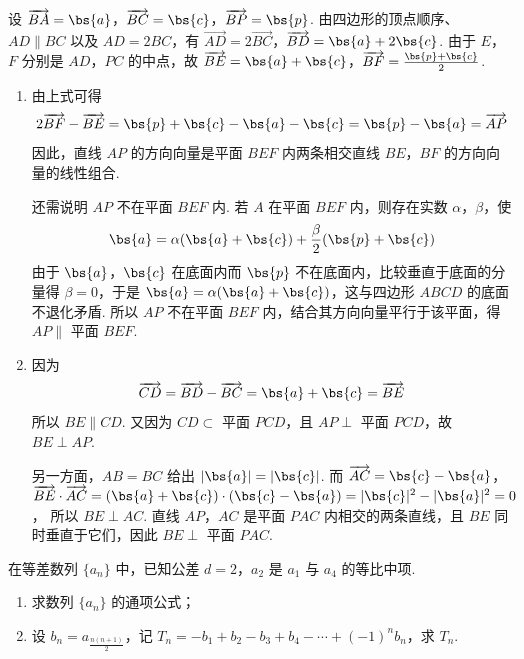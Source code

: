 \begin{solution}
设 \(\overrightarrow{BA}=\bs{a}\)，\(\overrightarrow{BC}=\bs{c}\)，\(\overrightarrow{BP}=\bs{p}\). 由四边形的顶点顺序、\(AD\parallel BC\) 以及 \(AD=2BC\)，有
\(\overrightarrow{AD}=2\overrightarrow{BC}\)，\(\overrightarrow{BD}=\bs{a}+2\bs{c}\).
由于 \(E\)，\(F\) 分别是 \(AD\)，\(PC\) 的中点，故
\(\overrightarrow{BE}=\bs{a}+\bs{c}\)，\(\overrightarrow{BF}=\frac{\bs{p}+\bs{c}}{2}\).

\begin{enumerate}
\item 由上式可得
\[
2\overrightarrow{BF}-\overrightarrow{BE}=\bs{p}+\bs{c}-\bs{a}-\bs{c}=\bs{p}-\bs{a}=\overrightarrow{AP}
\]
因此，直线 \(AP\) 的方向向量是平面 \(BEF\) 内两条相交直线 \(BE\)，\(BF\) 的方向向量的线性组合.

还需说明 \(AP\) 不在平面 \(BEF\) 内. 若 \(A\) 在平面 \(BEF\) 内，则存在实数 \(\alpha\)，\(\beta\)，使
\[
\bs{a}=\alpha(\bs{a}+\bs{c})+\frac{\beta}{2}(\bs{p}+\bs{c})
\]
由于 \(\bs{a}\)，\(\bs{c}\) 在底面内而 \(\bs{p}\) 不在底面内，比较垂直于底面的分量得 \(\beta=0\)，于是 \(\bs{a}=\alpha(\bs{a}+\bs{c})\)，这与四边形 \(ABCD\) 的底面不退化矛盾. 所以 \(AP\) 不在平面 \(BEF\) 内，结合其方向向量平行于该平面，得 \(AP\parallel\) 平面 \(BEF\).

\item 因为
\[
\overrightarrow{CD}=\overrightarrow{BD}-\overrightarrow{BC}=\bs{a}+\bs{c}=\overrightarrow{BE}
\]
所以 \(BE\parallel CD\). 又因为 \(CD\subset\) 平面 \(PCD\)，且 \(AP\perp\) 平面 \(PCD\)，故 \(BE\perp AP\).

另一方面，\(AB=BC\) 给出 \(\lvert\bs{a}\rvert=\lvert\bs{c}\rvert\). 而
\(\overrightarrow{AC}=\bs{c}-\bs{a}\)，\(\overrightarrow{BE}\cdot\overrightarrow{AC}=(\bs{a}+\bs{c})\cdot(\bs{c}-\bs{a})=\lvert\bs{c}\rvert^{2}-\lvert\bs{a}\rvert^{2}=0\)，
所以 \(BE\perp AC\). 直线 \(AP\)，\(AC\) 是平面 \(PAC\) 内相交的两条直线，且 \(BE\) 同时垂直于它们，因此 \(BE\perp\) 平面 \(PAC\).
\end{enumerate}
\end{solution}

\begin{problem}
在等差数列 \(\{a_{n}\}\) 中，已知公差 \(d = 2\)，\(a_{2}\) 是 \(a_{1}\) 与 \(a_{4}\) 的等比中项.

\begin{enumerate}
\item 求数列 \(\{a_{n}\}\) 的通项公式；
\item 设 \(b_n = a_{\frac{n(n+1)}{2}}\)，记 \(T_n = -b_1 + b_2 - b_3 + b_4 - \cdots + (-1)^n b_n\)，求 \(T_n\).
\end{enumerate}
\end{problem}


